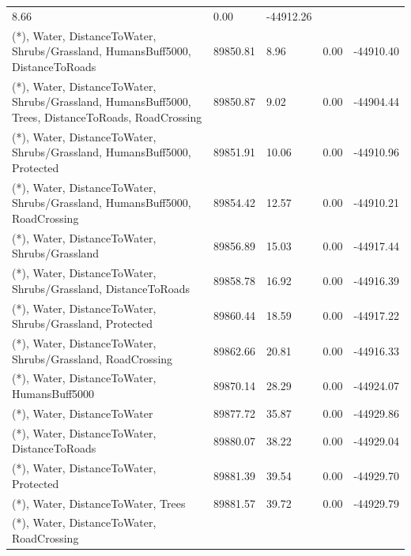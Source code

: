 \documentclass[abstract=on,10pt,a4paper,bibliography=totocnumbered]{scrartcl}
\begin{document}
\begin{table}[h]
\begin{center}
{\begin{tabular}{lllll}
          8.66 &
            0.00 &
              -44912.26 \\
      (*), Water, DistanceToWater, Shrubs/Grassland, HumansBuff5000,
      DistanceToRoads &
        89850.81 &
          8.96 &
            0.00 &
              -44910.40 \\
      (*), Water, DistanceToWater, Shrubs/Grassland, HumansBuff5000, Trees, DistanceToRoads, RoadCrossing &
        89850.87 &
          9.02 &
            0.00 &
              -44904.44 \\
      (*), Water, DistanceToWater, Shrubs/Grassland, HumansBuff5000, Protected &
        89851.91 &
          10.06 &
            0.00 &
              -44910.96 \\
      (*), Water, DistanceToWater, Shrubs/Grassland, HumansBuff5000, RoadCrossing &
        89854.42 &
          12.57 &
            0.00 &
              -44910.21 \\
      (*), Water, DistanceToWater, Shrubs/Grassland &
        89856.89 &
          15.03 &
            0.00 &
              -44917.44 \\
      (*), Water, DistanceToWater, Shrubs/Grassland, DistanceToRoads &
        89858.78 &
          16.92 &
            0.00 &
              -44916.39 \\
      (*), Water, DistanceToWater, Shrubs/Grassland, Protected &
        89860.44 &
          18.59 &
            0.00 &
              -44917.22 \\
      (*), Water, DistanceToWater, Shrubs/Grassland, RoadCrossing &
        89862.66 &
          20.81 &
            0.00 &
              -44916.33 \\
      (*), Water, DistanceToWater, HumansBuff5000 &
        89870.14 &
          28.29 &
            0.00 &
              -44924.07 \\
      (*), Water, DistanceToWater &
        89877.72 &
          35.87 &
            0.00 &
              -44929.86 \\
      (*), Water, DistanceToWater, DistanceToRoads &
        89880.07 &
          38.22 &
            0.00 &
              -44929.04 \\
      (*), Water, DistanceToWater, Protected &
        89881.39 &
          39.54 &
            0.00 &
              -44929.70 \\
      (*), Water, DistanceToWater, Trees &
        89881.57 &
          39.72 &
            0.00 &
              -44929.79 \\
      (*), Water, DistanceToWater, RoadCrossing &

\end{tabular}}
\end{center}
\end{table}
\end{document}
